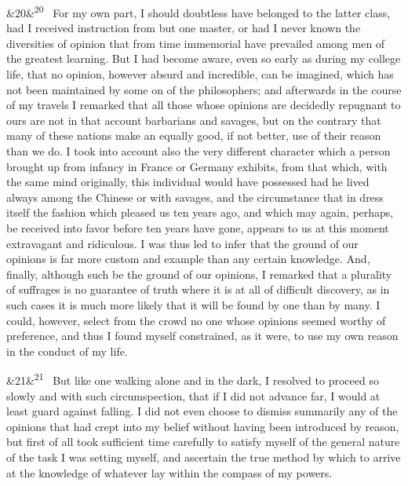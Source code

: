 \documentclass[12pt]{article}
\newcommand{\para}[1][]{\par\noindent\ifx&#1&\else\textsuperscript{\footnotesize #1}~\fi}
\begin{document}
\para[20] For my own part, I should doubtless have belonged to the latter class, had I received instruction from but one master, or had I never known the diversities of opinion that from time immemorial have prevailed among men of the greatest learning. But I had become aware, even so early as during my college life, that no opinion, however absurd and incredible, can be imagined, which has not been maintained by some on of the philosophers; and afterwards in the course of my travels I remarked that all those whose opinions are decidedly repugnant to ours are not in that account barbarians and savages, but on the contrary that many of these nations make an equally good, if not better, use of their reason than we do. I took into account also the very different character which a person brought up from infancy in France or Germany exhibits, from that which, with the same mind originally, this individual would have possessed had he lived always among the Chinese or with savages, and the circumstance that in dress itself the fashion which pleased us ten years ago, and which may again, perhaps, be received into favor before ten years have gone, appears to us at this moment extravagant and ridiculous. I was thus led to infer that the ground of our opinions is far more custom and example than any certain knowledge. And, finally, although such be the ground of our opinions, I remarked that a plurality of suffrages is no guarantee of truth where it is at all of difficult discovery, as in such cases it is much more likely that it will be found by one than by many. I could, however, select from the crowd no one whose opinions seemed worthy of preference, and thus I found myself constrained, as it were, to use my own reason in the conduct of my life.

\para[21] But like one walking alone and in the dark, I resolved to proceed so slowly and with such circumspection, that if I did not advance far, I would at least guard against falling. I did not even choose to dismiss summarily any of the opinions that had crept into my belief without having been introduced by reason, but first of all took sufficient time carefully to satisfy myself of the general nature of the task I was setting myself, and ascertain the true method by which to arrive at the knowledge of whatever lay within the compass of my powers.
\end{document}
